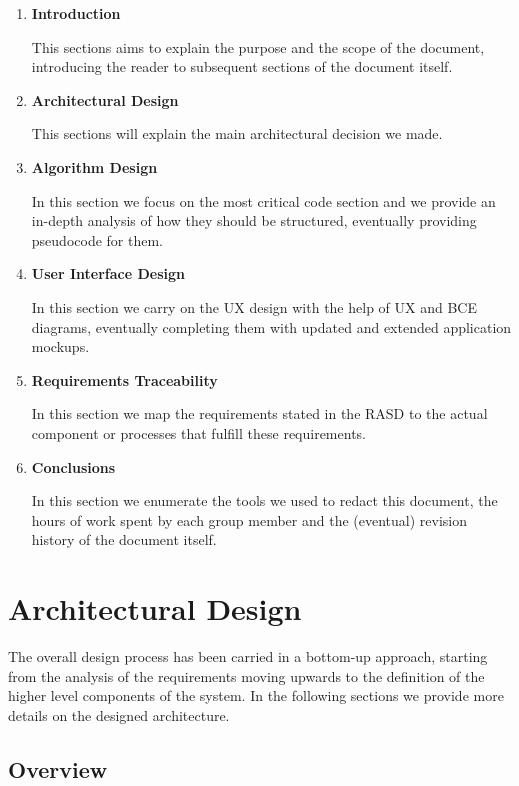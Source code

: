 \documentclass[11pt]{article} %
\begin{document}
\begin{enumerate}
	\item \textbf{Introduction}

	This sections aims to explain the purpose and the scope of the document, introducing the reader to subsequent sections of the document itself.

	\item \textbf{Architectural Design}
	 
	This sections will explain the main architectural decision we made.

	\item \textbf{Algorithm Design}

	In this section we focus on the most critical code section and we provide an in-depth analysis of how they should be structured, eventually providing pseudocode for them.
	
	\item \textbf{User Interface Design}

	In this section we carry on the UX design with the help of UX and BCE diagrams, eventually completing them with updated and extended application mockups.

	\item \textbf{Requirements Traceability}
	
	In this section we map the requirements stated in the RASD to the actual component or processes that fulfill these requirements.

	\item \textbf{Conclusions}

	In this section we enumerate the tools we used to redact this document, the hours of work spent by each group member and the (eventual) revision history of the document itself.
\end{enumerate}



\newpage
\section{Architectural Design}
The overall design process has been carried in a bottom-up approach, starting from the analysis of the requirements moving upwards to the definition of the higher level components of the system. In the following sections we provide more details on the designed architecture.

\subsection{Overview}
\end{document}
